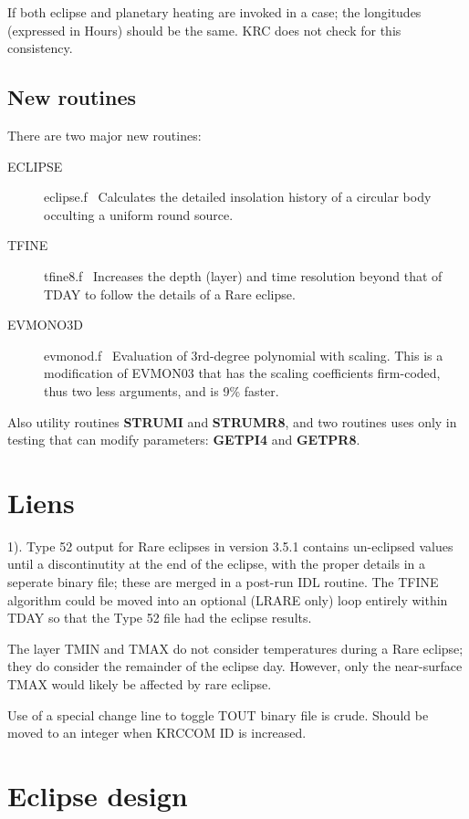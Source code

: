 \documentclass{article}
\begin{document}
 If both eclipse and planetary heating are invoked in a case; the longitudes
 (expressed in Hours) should be the same. KRC does not check for this
 consistency.

\subsection{New routines} 

There are two major new routines:
\begin{description}  %
 \item [ECLIPSE] eclipse.f  \ Calculates the detailed insolation history of a circular body occulting a uniform round source.  

\item [TFINE] tfine8.f  \ Increases the depth (layer) and time resolution beyond that of TDAY to follow the details of a Rare eclipse.  

\item [EVMONO3D] evmonod.f \ Evaluation of 3rd-degree polynomial with scaling. This is a
  modification of EVMON03 that has the scaling coefficients firm-coded, thus two
  less arguments, and is 9\% faster.
\end{description}

 Also utility routines \textbf{STRUMI} and \textbf{STRUMR8}, and two routines uses only in testing that can modify parameters: \textbf{GETPI4} and \textbf{GETPR8}.

\section{Liens}
1).  Type 52 output for Rare eclipses in version 3.5.1 contains un-eclipsed
values until a discontinutity at the end of the eclipse, with the proper details
in a seperate binary file; these are merged in a post-run IDL routine. The TFINE
algorithm could be moved into an optional (LRARE only) loop entirely within TDAY
so that the Type 52 file had the eclipse results.

The layer TMIN and TMAX do not consider temperatures during a Rare eclipse; they
do consider the remainder of the eclipse day. However, only the near-surface
TMAX would likely be affected by rare eclipse.

Use of a special change line to toggle TOUT binary file is crude. Should be moved to an integer when KRCCOM ID is increased.

\section{Eclipse design} 
\end{document}

